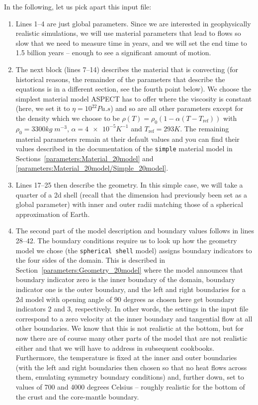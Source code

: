 \documentclass{article}
\newcommand{\aspect}{\textsc{ASPECT}}
\begin{document}
In the following, let us pick apart this input file:
\begin{enumerate}
  \item Lines 1--4 are just global parameters. Since we are interested in
  geophysically realistic simulations, we will use material parameters that
  lead to flows so slow that we need to measure time in years, and we will set
  the end time to 1.5 billion years -- enough to see a significant amount of
  motion.

  \item The next block (lines 7--14) describes the material that is convecting
  (for historical reasons, the remainder of the parameters that describe the
  equations is in a different section, see the fourth point below). We choose
  the simplest material model \aspect{} has to offer where the viscosity is
  constant (here, we set it to $\eta=10^{22} \si{Pa .  s}$) and so are
  all other parameters except for the density which we choose to be
  $\rho(T)=\rho_0(1-\alpha (T-T_{\text{ref}}))$ with $\rho_0=3300
  \si{kg}\;\si{m}^{-3}$, $\alpha=\num{4e-5} \si{K}^{-1}$ and
  $T_{\text{ref}}=293 \si{K}$. The remaining material parameters remain at their
  default values and you can find their values described in the documentation of
  the \texttt{simple} material model in
  Sections~\ref{parameters:Material_20model} and
  \ref{parameters:Material_20model/Simple_20model}.

  \item Lines 17--25 then describe the geometry. In this simple case, we will
  take a quarter of a 2d shell (recall that the dimension had previously been
  set as a global parameter) with inner and outer radii matching those of a
  spherical approximation of Earth.

  \item The second part of the model description and boundary values follows in
  lines 28--42. The boundary conditions require us to look up how the geometry model
  we chose (the \texttt{spherical shell} model) assigns boundary indicators to
  the four sides of the domain. This is described in
  Section~\ref{parameters:Geometry_20model} where the model announces that
  boundary indicator zero is the inner boundary of the domain, boundary
  indicator one is the outer boundary, and the left and right boundaries for a
  2d model with opening angle of 90 degrees as chosen here get boundary
  indicators 2 and 3, respectively. In other words, the settings in the input
  file correspond to a zero velocity at the inner boundary and tangential flow
  at all other boundaries. We know that this is not realistic at the bottom, but
  for now there are of course many other parts of the model that are not
  realistic either and that we will have to address in subsequent cookbooks.
  Furthermore, the temperature is fixed at the inner and outer boundaries (with
  the left and right boundaries then chosen so that no heat flows across them,
  emulating symmetry boundary conditions) and, further down, set to values of
  700 and 4000 degrees Celsius -- roughly realistic for the bottom of the crust
  and the core-mantle boundary.


\end{enumerate}
\end{document}
